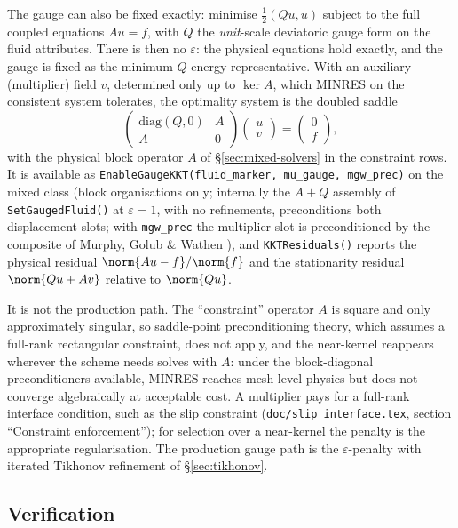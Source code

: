 \documentclass[11pt]{article}
\numberwithin{equation}{section}
\theoremstyle{remark}
\newcommand{\eps}{\varepsilon}
\newcommand{\code}[1]{\texttt{#1}}
\begin{document}
The gauge can also be fixed exactly: minimise $\frac12(Qu,u)$ subject to
the full coupled equations $Au = f$, with $Q$ the \emph{unit}-scale
deviatoric gauge form on the fluid attributes. There is then no $\eps$:
the physical equations hold exactly, and the gauge is fixed as the
minimum-$Q$-energy representative. With an auxiliary (multiplier) field
$v$, determined only up to $\ker A$, which MINRES on the consistent system
tolerates, the optimality system is the doubled saddle
\begin{equation}
  \begin{pmatrix} \mathrm{diag}(Q, 0) & A\\ A & 0\end{pmatrix}
  \begin{pmatrix} u\\ v\end{pmatrix} =
  \begin{pmatrix} 0\\ f\end{pmatrix},
\end{equation}
with the physical block operator $A$ of \S\ref{sec:mixed-solvers} in the
constraint rows. It is available as \code{EnableGaugeKKT(fluid\_marker,
mu\_gauge, mgw\_prec)} on the mixed class (block organisations only;
internally the $A + Q$ assembly of \code{SetGaugedFluid()} at $\eps = 1$,
with no refinements, preconditions both displacement slots; with
\code{mgw\_prec} the multiplier slot is preconditioned by the composite of
Murphy, Golub \& Wathen \cite{MurphyGolubWathen2000}), and
\code{KKTResiduals()} reports the physical residual $\norm{Au - f}/\norm{f}$
and the stationarity residual $\norm{Qu + Av}$ relative to $\norm{Qu}$.

It is not the production path. The ``constraint'' operator $A$ is square
and only approximately singular, so saddle-point preconditioning theory,
which assumes a full-rank rectangular constraint, does not apply, and the
near-kernel reappears wherever the scheme needs solves with $A$: under the
block-diagonal preconditioners available, MINRES reaches mesh-level physics
but does not converge algebraically at acceptable cost. A multiplier pays
for a full-rank interface condition, such as the slip constraint
(\code{doc/slip\_interface.tex}, section ``Constraint enforcement'');
for selection over a near-kernel the penalty is the appropriate regularisation. The production gauge path is the
$\eps$-penalty with iterated Tikhonov refinement of \S\ref{sec:tikhonov}.

\subsection{Verification}
\label{sec:gauged-verif}
\end{document}
